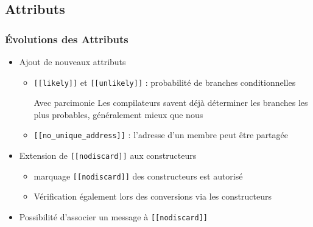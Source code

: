 \documentclass[C++.tex]{subfiles}
\begin{document}
\subsection*{Attributs}
\begin{frame}[fragile]
	\frametitle{Évolutions des Attributs}
	\begin{itemize}
		\item Ajout de nouveaux attributs
		\begin{itemize}
			\item \lstinline|[[likely]]| et \lstinline|[[unlikely]]| : probabilité de branches conditionnelles


			\begin{alertblock}{Avec parcimonie}
				Les compilateurs savent déjà déterminer les branches les plus probables, généralement mieux que nous 
			\end{alertblock}

			\item \lstinline|[[no_unique_address]]| : l'adresse d'un membre peut être partagée
		
		\end{itemize}

		\item Extension de \lstinline|[[nodiscard]]| aux constructeurs
		\begin{itemize}
			\item marquage \lstinline|[[nodiscard]]| des constructeurs est autorisé


			\item Vérification également lors des conversions via les constructeurs

		\end{itemize}
		\item Possibilité d'associer un message à \lstinline|[[nodiscard]]|

	\end{itemize}
\end{frame}
\end{document}
